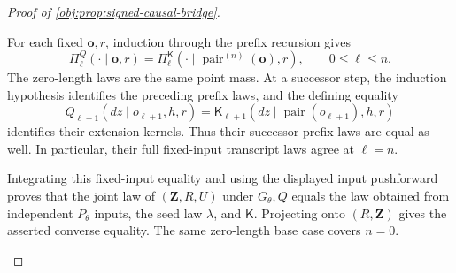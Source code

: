 \documentclass[11pt]{article}
\begin{document}
\begin{proof}[Proof of \cref{obj:prop:signed-causal-bridge}]
\begin{enumerate}
For each fixed \(\mathbf o,r\), induction through the prefix recursion
gives
\[
\Pi_\ell^Q(\cdot\mid\mathbf o,r)
=\Pi_\ell^{\mathsf K}
(\cdot\mid\operatorname{pair}^{(n)}(\mathbf o),r),
\qquad 0\le\ell\le n.
\]
The zero-length laws are the same point mass. At a successor step,
the induction hypothesis identifies the preceding prefix laws, and
the defining equality
\[
Q_{\ell+1}(dz\mid o_{\ell+1},h,r)
=\mathsf K_{\ell+1}
(dz\mid\operatorname{pair}(o_{\ell+1}),h,r)
\]
identifies their extension kernels. Thus their successor prefix laws
are equal as well. In particular, their full fixed-input transcript
laws agree at \(\ell=n\).

Integrating this fixed-input equality and using the displayed input
pushforward proves that the joint law of \((\mathbf Z,R,U)\) under
\(G_\theta,Q\) equals the law obtained from independent \(P_\theta\)
inputs, the seed law \(\lambda\), and \(\mathsf K\). Projecting onto
\((R,\mathbf Z)\) gives the asserted converse equality. The same
zero-length base case covers \(n=0\).
\end{enumerate}
\end{proof}
\end{document}
